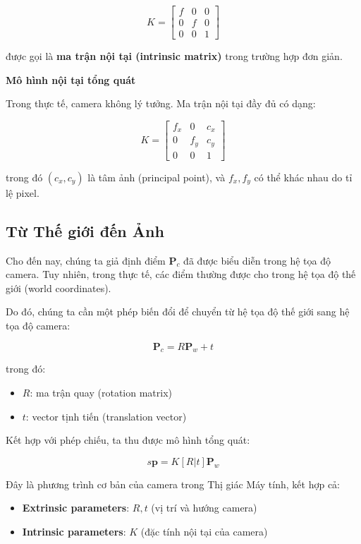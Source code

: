\[
K =
\begin{bmatrix}
	f & 0 & 0 \\
	0 & f & 0 \\
	0 & 0 & 1
\end{bmatrix}
\]

được gọi là \textbf{ma trận nội tại (intrinsic matrix)} trong trường hợp đơn giản.

\begin{mdframed}[style=infobox]
	\textbf{Mô hình nội tại tổng quát}
	
	Trong thực tế, camera không lý tưởng. Ma trận nội tại đầy đủ có dạng:
	
	\[
	K =
	\begin{bmatrix}
		f_x & 0 & c_x \\
		0 & f_y & c_y \\
		0 & 0 & 1
	\end{bmatrix}
	\]
	
	trong đó $(c_x, c_y)$ là tâm ảnh (principal point), và $f_x, f_y$ có thể khác nhau do tỉ lệ pixel.
\end{mdframed}

\subsection{Từ Thế giới đến Ảnh}
\label{subsec:world_to_image}

Cho đến nay, chúng ta giả định điểm $\mathbf{P}_c$ đã được biểu diễn trong hệ tọa độ camera. Tuy nhiên, trong thực tế, các điểm thường được cho trong hệ tọa độ thế giới (world coordinates).

Do đó, chúng ta cần một phép biến đổi để chuyển từ hệ tọa độ thế giới sang hệ tọa độ camera:

\[
\mathbf{P}_c = R \mathbf{P}_w + t
\]

trong đó:
\begin{itemize}
	\item $R$: ma trận quay (rotation matrix)
	\item $t$: vector tịnh tiến (translation vector)
\end{itemize}

Kết hợp với phép chiếu, ta thu được mô hình tổng quát:

\[
s \mathbf{p} = K [R|t] \mathbf{P}_w
\]

Đây là phương trình cơ bản của camera trong Thị giác Máy tính, kết hợp cả:
\begin{itemize}
	\item \textbf{Extrinsic parameters}: $R, t$ (vị trí và hướng camera)
	\item \textbf{Intrinsic parameters}: $K$ (đặc tính nội tại của camera)
\end{itemize}

